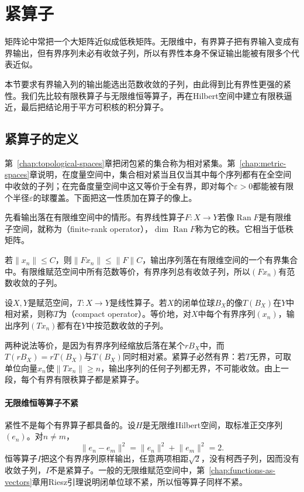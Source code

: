 \section{紧算子}
\label{sec:lop-compact}

矩阵论中常把一个大矩阵近似成低秩矩阵。无限维中，有界算子把有界输入变成有界输出，但有界序列未必有收敛子列，所以有界性本身不保证输出能被有限多个代表近似。

本节要求有界输入列的输出能选出范数收敛的子列，由此得到比有界性更强的紧性。我们先比较有限秩算子与无限维恒等算子，再在Hilbert空间中建立有限秩逼近，最后把结论用于平方可积核的积分算子。

\subsection{紧算子的定义}
\label{sec:lop-compact-def}

第~\ref{chap:topological-spaces}章把闭包紧的集合称为相对紧集。第~\ref{chap:metric-spaces}章说明，在度量空间中，集合相对紧当且仅当其中每个序列都有在全空间中收敛的子列；在完备度量空间中这又等价于全有界，即对每个$\varepsilon>0$都能被有限个半径$\varepsilon$的球覆盖。下面把这一性质加在算子的像上。

先看输出落在有限维空间中的情形。有界线性算子$F:X\to Y$若像$\operatorname{Ran}F$是有限维子空间，就称为（finite-rank operator），$\dim\operatorname{Ran}F$称为它的秩。它相当于低秩矩阵。

若$\lVert x_n\rVert\leq C$，则$\lVert Fx_n\rVert\leq\lVert F\rVert C$，输出序列落在有限维空间的一个有界集合中。有限维赋范空间中所有范数等价，有界序列总有收敛子列，所以$(Fx_n)$有范数收敛的子列。

\begin{definition}[紧算子]
\label{def:lop-compact-operator}
设$X,Y$是赋范空间，$T:X\to Y$是线性算子。若$X$的闭单位球$B_X$的像$T(B_X)$在$Y$中相对紧，则称$T$为（compact operator）。等价地，对$X$中每个有界序列$(x_n)$，输出序列$(Tx_n)$都有在$Y$中按范数收敛的子列。
\end{definition}

两种说法等价，是因为有界序列经缩放后落在某个$rB_X$中，而$T(rB_X)=rT(B_X)$与$T(B_X)$同时相对紧。紧算子必然有界：若$T$无界，可取单位向量$x_n$使$\lVert Tx_n\rVert\geq n$，输出序列的任何子列都无界，不可能收敛。由上一段，每个有界有限秩算子都是紧算子。

\paragraph{无限维恒等算子不紧}
紧性不是每个有界算子都具备的。设$H$是无限维Hilbert空间，取标准正交序列$(e_n)$。对$n\neq m$，
\[
 \lVert e_n-e_m\rVert^2=\lVert e_n\rVert^2+\lVert e_m\rVert^2=2.
\]
恒等算子$I$把这个有界序列原样输出，任意两项相距$\sqrt2$，没有柯西子列，因而没有收敛子列，$I$不是紧算子。一般的无限维赋范空间中，第~\ref{chap:functions-as-vectors}章用Riesz引理说明闭单位球不紧，所以恒等算子同样不紧。

